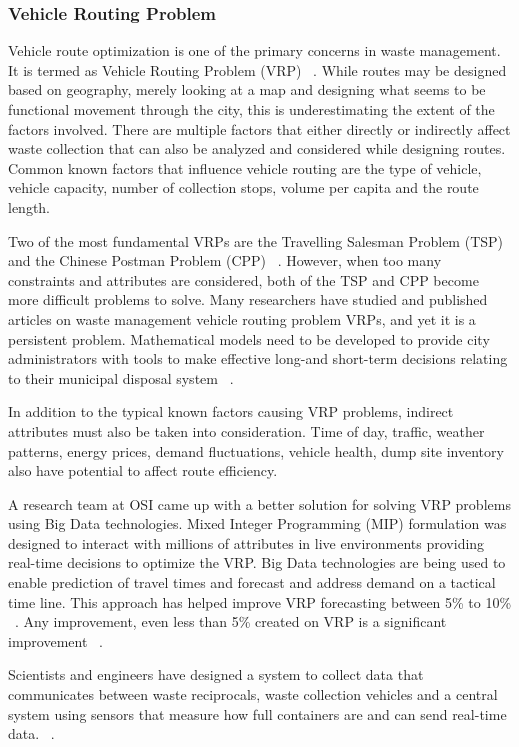 \documentclass[sigconf]{acmart}
\begin{document}
\subsubsection{Vehicle Routing Problem}
Vehicle route optimization is one of the primary concerns in waste management. It is termed as Vehicle Routing Problem (VRP) ~\cite{dantzig1959}.   While routes may be designed based on geography, merely looking at a map and designing what seems to be functional movement through the city, this is underestimating the extent of the factors involved.  There are multiple factors that either directly or indirectly affect waste collection that can also be analyzed and considered while designing routes. Common known factors that influence vehicle routing are the type of vehicle, vehicle capacity, number of collection stops, volume per capita and the route length. 

Two of the most fundamental VRPs are the Travelling Salesman Problem (TSP) and the Chinese Postman Problem (CPP) ~\cite{belien2012}. However, when too many constraints and attributes are considered, both of the TSP and CPP become more difficult problems to solve. Many researchers have studied and published articles on waste management vehicle routing problem VRPs, and yet it is a persistent problem. Mathematical models need to be developed to provide city administrators with tools to make effective long-and short-term decisions relating to their municipal disposal system ~\cite{bhat1996}. 

In addition to the typical known factors causing VRP problems, indirect attributes must also be taken into consideration.  Time of day, traffic, weather patterns, energy prices, demand fluctuations, vehicle health, dump site inventory also have potential to affect route efficiency. 

A research team at OSI came up with a better solution for solving VRP problems using Big Data technologies. Mixed Integer Programming (MIP) formulation was designed to interact with millions of attributes in live environments providing real-time decisions to optimize the VRP. Big Data technologies are being used to enable prediction of travel times and forecast and address demand on a tactical time line. This approach has helped improve VRP forecasting between  5\% to 10\% ~\cite{vijay2013}. Any improvement, even less than 5\% created on VRP is a significant improvement ~\cite{hasle2007}.

Scientists and engineers have designed a system to collect data that communicates between waste reciprocals, waste collection vehicles and a central system using sensors that measure how full containers are and can send real-time data.  ~\cite{faccio2011}.
\end{document}
